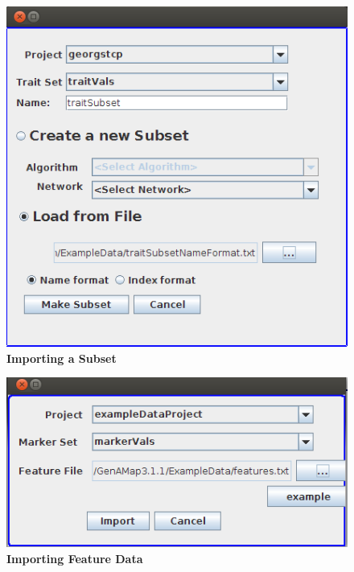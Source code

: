 \documentclass{article}
\begin{document}
\begin{figure}
\includegraphics[width=\textwidth]{Figure6.png}
\caption{\textbf{Importing a Subset}}
\label{subset}
\end{figure}

\begin{figure}
\includegraphics[width=\textwidth]{Figure7.png}
\caption{\textbf{Importing Feature Data}}
\label{features}
\end{figure}
\end{document}

